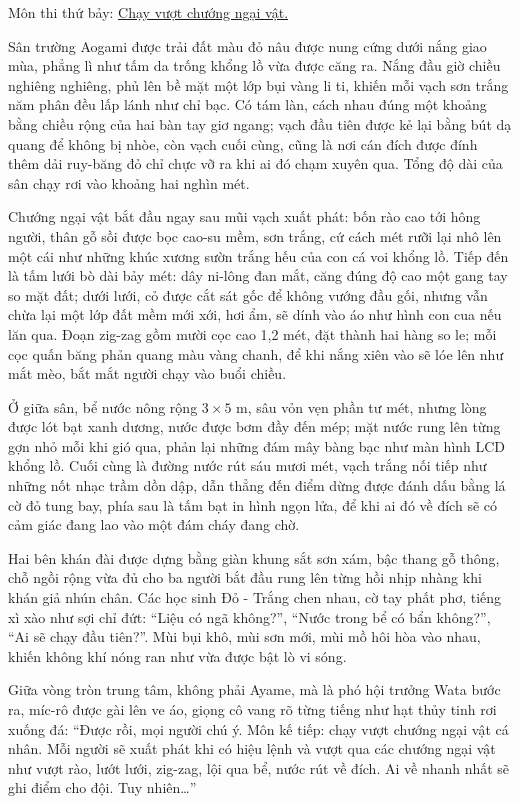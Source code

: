 \documentclass[../main.tex]{subfiles}
\begin{document}
\begin{center}
  {\color{vol} Môn thi thứ bảy: \uline{Chạy vượt chướng ngại vật.}}
\end{center}

Sân trường Aogami được trải đất màu đỏ nâu được nung cứng dưới nắng giao mùa, phẳng lì như tấm da trống khổng lồ vừa được căng ra. Nắng đầu giờ chiều nghiêng nghiêng, phủ lên bề mặt một lớp bụi vàng li ti, khiến mỗi vạch sơn trắng năm phân đều lấp lánh như chỉ bạc. Có tám làn, cách nhau đúng một khoảng bằng chiều rộng của hai bàn tay giơ ngang; vạch đầu tiên được kẻ lại bằng bút dạ quang để không bị nhòe, còn vạch cuối cùng, cũng là nơi cán đích được đính thêm dải ruy-băng đỏ chỉ chực vỡ ra khi ai đó chạm xuyên qua. Tổng độ dài của sân chạy rơi vào khoảng hai nghìn mét.

Chướng ngại vật bắt đầu ngay sau mũi vạch xuất phát: bốn rào cao tới hông người, thân gỗ sồi được bọc cao-su mềm, sơn trắng, cứ cách mét rưỡi lại nhô lên một cái như những khúc xương sườn trắng hếu của con cá voi khổng lồ. Tiếp đến là tấm lưới bò dài bảy mét: dây ni-lông đan mắt, căng đúng độ cao một gang tay so mặt đất; dưới lưới, cỏ được cắt sát gốc để không vướng đầu gối, nhưng vẫn chừa lại một lớp đất mềm mới xới, hơi ẩm, sẽ dính vào áo như hình con cua nếu lăn qua. Đoạn zig-zag gồm mười cọc cao 1,2 mét, đặt thành hai hàng so le; mỗi cọc quấn băng phản quang màu vàng chanh, để khi nắng xiên vào sẽ lóe lên như mắt mèo, bắt mắt người chạy vào buổi chiều.

Ở giữa sân, bể nước nông rộng $3 \times 5$ m, sâu vỏn vẹn phần tư mét, nhưng lòng được lót bạt xanh dương, nước được bơm đầy đến mép; mặt nước rung lên từng gợn nhỏ mỗi khi gió qua, phản lại những đám mây bàng bạc như màn hình LCD khổng lồ. Cuối cùng là đường nước rút sáu mươi mét, vạch trắng nối tiếp như những nốt nhạc trầm dồn dập, dẫn thẳng đến điểm dừng được đánh dấu bằng lá cờ đỏ tung bay, phía sau là tấm bạt in hình ngọn lửa, để khi ai đó về đích sẽ có cảm giác đang lao vào một đám cháy đang chờ.

Hai bên khán đài được dựng bằng giàn khung sắt sơn xám, bậc thang gỗ thông, chỗ ngồi rộng vừa đủ cho ba người bắt đầu rung lên từng hồi nhịp nhàng khi khán giả nhún chân. Các học sinh Đỏ - Trắng chen nhau, cờ tay phất phơ, tiếng xì xào như sợi chỉ đứt: ``Liệu có ngã không?'', ``Nước trong bể có bẩn không?'', ``Ai sẽ chạy đầu tiên?''. Mùi bụi khô, mùi sơn mới, mùi mồ hôi hòa vào nhau, khiến không khí nóng ran như vừa được bật lò vi sóng.

Giữa vòng tròn trung tâm, không phải Ayame, mà là phó hội trưởng Wata bước ra, míc-rô được gài lên ve áo, giọng cô vang rõ từng tiếng như hạt thủy tinh rơi xuống đá: ``Được rồi, mọi người chú ý. Môn kế tiếp: chạy vượt chướng ngại vật cá nhân. Mỗi người sẽ xuất phát khi có hiệu lệnh và vượt qua các chướng ngại vật như vượt rào, lướt lưới, zig-zag, lội qua bể, nước rút về đích. Ai về nhanh nhất sẽ ghi điểm cho đội. Tuy nhiên\dots''
\end{document}
